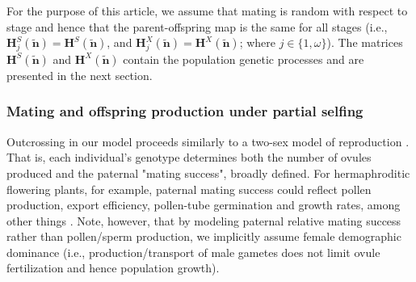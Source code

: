 \documentclass[11pt,draft]{article}
\def\mbf#1{\mathbf{#1}}
\def\mcal#1{\mathcal{#1}}
\begin{document}

For the purpose of this article, we assume that mating is random with respect to stage and hence that the parent-offspring map is the same for all stages (i.e., $\mbf{H}^S_{j}(\tilde{\mbf{n}}) = \mbf{H}^S(\tilde{\mbf{n}})$, and $\mbf{H}^X_{j}(\tilde{\mbf{n}}) = \mbf{H}^X(\tilde{\mbf{n}})$; where $j \in \{1,\omega\}$). The matrices $\mbf{H}^S(\tilde{\mbf{n}})$ and $\mbf{H}^X(\tilde{\mbf{n}})$ contain the population genetic processes and are presented in the next section.

\subsubsection*{Mating and offspring production under partial selfing}
 Outcrossing in our model proceeds similarly to a two-sex model of reproduction \citep{deVriesCaswell2019b}. That is, each individual's genotype determines both the number of ovules produced and the paternal "mating success", broadly defined. For hermaphroditic flowering plants, for example, paternal mating success could reflect pollen production, export efficiency, pollen-tube germination and growth rates, among other things \citep{LloydWebb1986, WangBarrett2020, Harder2016}. Note, however, that by modeling paternal relative mating success rather than pollen/sperm production, we implicitly assume female demographic dominance (i.e., production/transport of male gametes does not limit ovule fertilization and hence population growth).
\end{document}
